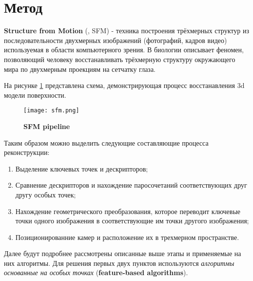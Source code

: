\section{Метод }

\textbf{Structure from Motion} (, SFM) - техника построения трёхмерных структур из последовательности двухмерных изображений (фотографий, кадров видео) используемая в области компьютерного зрения. В биологии описывает феномен, позволяющий человеку восстанавливать трёхмерную структуру окружающего мира по двухмерным проекциям на сетчатку глаза.

На рисунке \ref{fig:sfm} представлена схема, демонстрирующая процесс восстанавления 3d модели поверхности.

\begin{figure}[h]
    \centering
    \texttt{[image: sfm.png]}
    \caption{\textbf{SFM pipeline}}
    \label{fig:sfm}
\end{figure}

Таким образом можно выделить следующие составляющие процесса реконструкции:

\begin{enumerate}
    \item Выделение ключевых точек и дескрипторов;
    \item Сравнение дескрипторов и нахождение паросочетаний соответствующих друг другу особых точек;
    \item Нахождение геометрического преобразования, которое переводит ключевые точки одного изображения в соответствующие им точки другого изображения;
    \item Позиционированние камер и расположение их в трехмерном пространстве.
\end{enumerate}

Далее будут подробнее рассмотрены описанные выше этапы и применяемые на них алгоритмы. Для решения первых двух пунктов используются \textit{алгоритмы основанные на особых точках} (\textbf{feature-based algorithms}).
